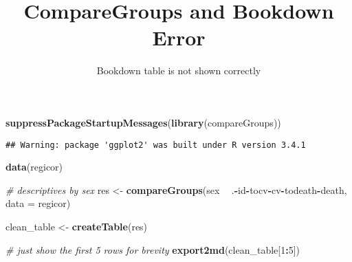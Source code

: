 \documentclass[]{article}
\title{CompareGroups and Bookdown Error}
\subtitle{Bookdown table is not shown correctly}
\author{}
\date{}
\newenvironment{Shaded}{\begin{snugshade}}{\end{snugshade}}
\newcommand{\KeywordTok}[1]{\textcolor[rgb]{0.13,0.29,0.53}{\textbf{#1}}}
\newcommand{\DataTypeTok}[1]{\textcolor[rgb]{0.13,0.29,0.53}{#1}}
\newcommand{\DecValTok}[1]{\textcolor[rgb]{0.00,0.00,0.81}{#1}}
\newcommand{\StringTok}[1]{\textcolor[rgb]{0.31,0.60,0.02}{#1}}
\newcommand{\CommentTok}[1]{\textcolor[rgb]{0.56,0.35,0.01}{\textit{#1}}}
\newcommand{\OtherTok}[1]{\textcolor[rgb]{0.56,0.35,0.01}{#1}}
\newcommand{\OperatorTok}[1]{\textcolor[rgb]{0.81,0.36,0.00}{\textbf{#1}}}
\newcommand{\NormalTok}[1]{#1}
\begin{document}
\maketitle

{
\setcounter{tocdepth}{2}
\tableofcontents
}
\begin{Shaded}
\begin{Highlighting}[]
\KeywordTok{suppressPackageStartupMessages}\NormalTok{(}\KeywordTok{library}\NormalTok{(compareGroups))}
\end{Highlighting}
\end{Shaded}

\begin{verbatim}
## Warning: package 'ggplot2' was built under R version 3.4.1
\end{verbatim}

\begin{Shaded}
\end{Shaded}

\begin{Shaded}
\begin{Highlighting}[]
\KeywordTok{data}\NormalTok{(regicor)}

\CommentTok{# descriptives by sex}
\NormalTok{res <-}\StringTok{ }\KeywordTok{compareGroups}\NormalTok{(sex }\OperatorTok{~}\StringTok{ }\NormalTok{.}\OperatorTok{-}\NormalTok{id}\OperatorTok{-}\NormalTok{tocv}\OperatorTok{-}\NormalTok{cv}\OperatorTok{-}\NormalTok{todeath}\OperatorTok{-}\NormalTok{death, }\DataTypeTok{data =}\NormalTok{ regicor)}

\NormalTok{clean_table <-}\StringTok{ }\KeywordTok{createTable}\NormalTok{(res)}
\end{Highlighting}
\end{Shaded}

\begin{Shaded}
\begin{Highlighting}[]
\CommentTok{# just show the first 5 rows for brevity}
\KeywordTok{export2md}\NormalTok{(clean_table[}\DecValTok{1}\OperatorTok{:}\DecValTok{5}\NormalTok{])}
\end{Highlighting}
\end{Shaded}
\end{document}
